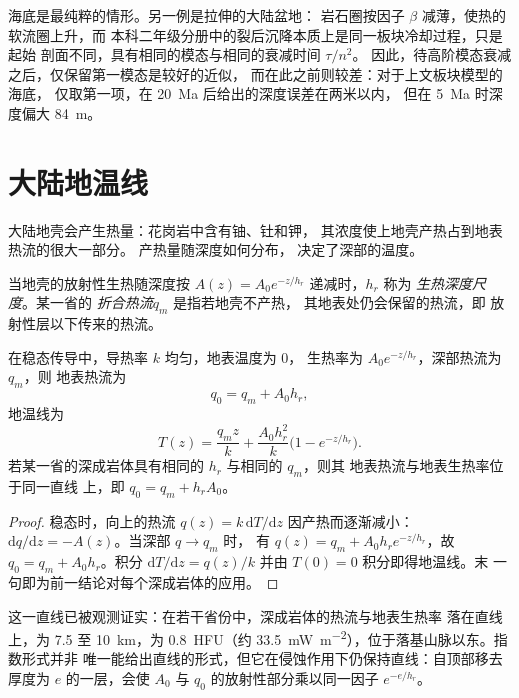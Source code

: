 海底是最纯粹的情形。另一例是拉伸的大陆盆地：
岩石圈按因子 $\beta$ 减薄，使热的软流圈上升，而
本科二年级分册中的裂后沉降本质上是同一板块冷却过程，只是起始
剖面不同，具有相同的模态与相同的衰减时间 $\tau/n^2$。
因此，待高阶模态衰减之后，仅保留第一模态是较好的近似，
而在此之前则较差：对于上文板块模型的海底，
仅取第一项，在 \qty{20}{Ma} 后给出的深度误差在两米以内，
但在 \qty{5}{Ma} 时深度偏大 \qty{84}{m}。

\section{大陆地温线}

大陆地壳会产生热量：花岗岩中含有铀、钍和钾，
其浓度使上地壳产热占到地表热流的很大一部分。
产热量随深度如何分布，
决定了深部的温度。

\begin{definition}\label{def:b3:lithosphere-thermal-models:reduced}
当地壳的放射性生热随深度按
$A(z) = A_0e^{-z/h_r}$ 递减时，$h_r$ 称为
\emph{生热深度尺度}。某一省的
\emph{折合热流}$q_m$ 是指若地壳不产热，
其地表处仍会保留的热流，即
放射性层以下传来的热流。
\end{definition}

\begin{proposition}[指数型生热]\label{prop:b3:lithosphere-thermal-models:exponential}
在稳态传导中，导热率 $k$ 均匀，地表温度为 $0$，
生热率为 $A_0e^{-z/h_r}$，深部热流为 $q_m$，则
地表热流为
\[
  q_0 = q_m + A_0h_r,
\]
地温线为
\[
  T(z) = \frac{q_mz}{k} + \frac{A_0h_r^2}{k}\bigl(1 - e^{-z/h_r}\bigr).
\]
若某一省的深成岩体具有相同的 $h_r$ 与相同的 $q_m$，则其
地表热流与地表生热率位于同一直线
上，即 $q_0 = q_m + h_rA_0$。
\end{proposition}

\begin{proof}
稳态时，向上的热流 $q(z) = k\,\mathrm dT/\mathrm dz$
因产热而逐渐减小：$\mathrm dq/\mathrm dz = -A(z)$。当深部 $q \to q_m$ 时，
有 $q(z) = q_m + A_0h_re^{-z/h_r}$，故 $q_0 = q_m + A_0h_r$。积分
$\mathrm dT/\mathrm dz = q(z)/k$ 并由 $T(0) = 0$ 积分即得地温线。末
一句即为前一结论对每个深成岩体的应用。
\end{proof}

这一直线已被观测证实：在若干省份中，深成岩体的热流与地表生热率
落在直线上，为 7.5 至
\qty{10}{km}，为 \qty{0.8}{HFU}（约
\qty{33.5}{mW.m^{-2}}），位于落基山脉以东。指数形式并非
唯一能给出直线的形式，但它在侵蚀作用下仍保持直线：自顶部移去厚度为 $e$ 的一层，会使
$A_0$ 与 $q_0$ 的放射性部分乘以同一因子 $e^{-e/h_r}$。

